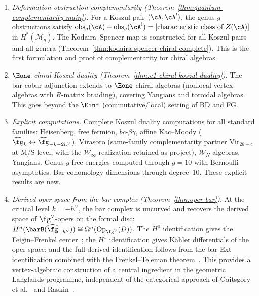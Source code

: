 \begin{enumerate}[label=\emph{(\arabic*)}]
\item \emph{Deformation-obstruction complementarity
  (Theorem~\ref{thm:quantum-complementarity-main}).}
  For a Koszul pair $(\cA, \cA^!)$, the genus-$g$ obstructions
  satisfy $\mathrm{obs}_g(\cA) + \mathrm{obs}_g(\cA^!) =
  [\text{characteristic class of } Z(\cA)]$ in $H^*(\overline{\mathcal{M}}_g)$.
  The Kodaira--Spencer map is constructed for all Koszul pairs
  and all genera (Theorem~\ref{thm:kodaira-spencer-chiral-complete}).
  This is the first formulation and proof of complementarity
  for chiral algebras.

\item \emph{$\Eone$-chiral Koszul duality
  (Theorem~\ref{thm:e1-chiral-koszul-duality}).}
  The bar-cobar adjunction extends to $\Eone$-chiral algebras
  (nonlocal vertex algebras with $R$-matrix braiding), covering
  Yangians and toroidal algebras.  This goes beyond the
  $\Einf$ (commutative/local) setting of BD and FG.

\item \emph{Explicit computations.}
  Complete Koszul duality computations for all standard families:
  Heisenberg, free fermion, $bc$-$\beta\gamma$, affine Kac--Moody
  ($\widehat{\fg}_k \leftrightarrow \widehat{\fg}_{-k-2h^\vee}$),
  Virasoro
  \textup{(}same-family complementarity partner
  $\mathrm{Vir}_{26-c}$ at M/S-level, with the
  $\mathcal{W}_\infty$ realization retained as project\textup{)},
  $\mathcal{W}_N$ algebras, Yangians.
  Genus-$g$ free energies computed through $g = 10$ with
  Bernoulli asymptotics.  Bar cohomology dimensions through
  degree~$10$.  These explicit results are new.

\item \emph{Derived oper space from the bar complex
  (Theorem~\ref{thm:oper-bar}).}
  At the critical level $k = -h^\vee$, the bar complex is uncurved
  and recovers the derived space of
  $\fg^\vee$-opers on the formal disc:
  $H^n(\barB(\widehat{\fg}_{-h^\vee}))
  \cong \Omega^n(\mathrm{Op}_{\fg^\vee}(D))$.
  The $H^0$ identification gives the Feigin--Frenkel
  center~\cite{Feigin-Frenkel}; the $H^1$ identification
  gives K\"ahler differentials of the oper space; and the
  full derived identification follows from the bar-Ext
  identification combined with the
  Frenkel--Teleman theorem~\cite{FT06}.
  This provides a vertex-algebraic construction of a
  central ingredient in the geometric Langlands programme,
  independent of the categorical approach of
  Gaitsgory et al.~\cite{GLC24} and
  Raskin~\cite{Raskin24}.


\end{enumerate}
